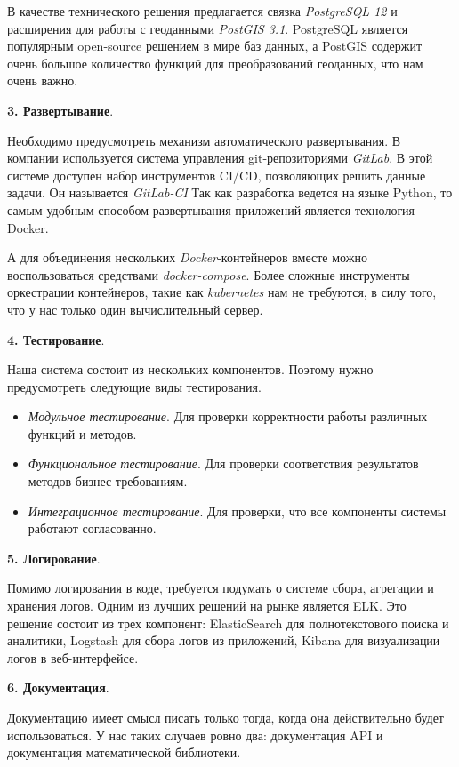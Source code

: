 В качестве технического решения предлагается связка \textit{PostgreSQL 12} и расширения для работы с геоданными
\textit{PostGIS 3.1}. PostgreSQL является популярным open-source решением в мире баз данных,
а PostGIS содержит очень большое количество функций для преобразований геоданных, что нам очень важно\cite{PostGIS}.

\noindent \textbf{3. Развертывание}.

Необходимо предусмотреть механизм автоматического развертывания.
В компании используется система управления git-репозиториями \textit{GitLab}.
В этой системе доступен набор инструментов CI/CD, позволяющих решить данные задачи. Он называется \textit{GitLab-CI}
Так как разработка ведется на языке Python, то самым удобным способом развертывания приложений является технология 
Docker\cite{Docker}.

А для объединения нескольких \textit{Docker}-контейнеров вместе можно воспользоваться средствами \textit{docker-compose}.
Более сложные инструменты оркестрации контейнеров, такие как \textit{kubernetes} нам не требуются, в силу того, что у нас
только один вычислительный сервер.

\noindent \textbf{4. Тестирование}.

Наша система состоит из нескольких компонентов. Поэтому нужно предусмотреть следующие виды тестирования\cite{ArtOfTesting}.
\begin{itemize}
    \item \textit{Модульное тестирование}. Для проверки корректности работы различных функций и методов.
    \item \textit{Функциональное тестирование}. Для проверки соответствия результатов методов бизнес-требованиям.
    \item \textit{Интеграционное тестирование}. Для проверки, что все компоненты системы работают согласованно.
\end{itemize}

\noindent \textbf{5. Логирование}.

Помимо логирования в коде, требуется подумать о системе сбора, агрегации и хранения логов.
Одним из лучших решений на рынке является ELK. Это решение состоит из трех компонент: ElasticSearch для полнотекстового
поиска и аналитики, Logstash для сбора логов из приложений, Kibana для визуализации логов в веб-интерфейсе.

\noindent \textbf{6. Документация}.

Документацию имеет смысл писать только тогда, когда она действительно будет использоваться.
У нас таких случаев ровно два: документация API и документация математической библиотеки.

